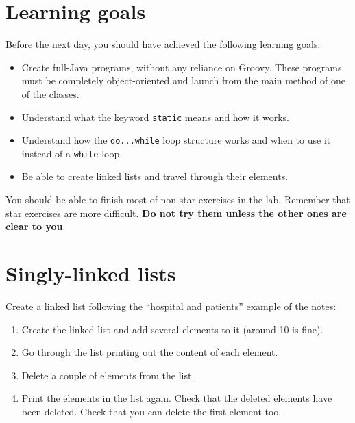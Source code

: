 \documentclass{article}
\begin{document}
\section*{Learning goals}
\label{sec:learning-goals}

Before the next day, you should have achieved the following learning
goals: 

\begin{itemize}
\item Create full-Java programs, without any reliance on Groovy. These
  programs must be completely object-oriented and launch from the main
  method of one of the classes.
\item Understand what the keyword \verb+static+ means and how it
  works. 
\item Understand how the \verb+do...while+ loop structure works and
  when to use it instead of a \verb+while+ loop.
\item Be able to create linked lists and travel through their
  elements. 
\end{itemize}

You should be able to finish most of non-star exercises in the lab. 
Remember that star exercises are more difficult. 
\textbf{Do not try them unless the other ones are clear to you}. 

\section{Singly-linked lists}
\label{sec:doubly-linked-lists}

Create a linked list following  the ``hospital and patients'' example
of the notes:

\begin{enumerate}
\item Create the linked list and add several elements to it
  (around 10 is fine). 
\item Go through the list printing out the content of
  each element.
\item Delete a couple of elements from the list. 
\item Print the elements in the list again. Check that the deleted
  elements have been deleted. Check that you can delete the first
  element too. 
\end{enumerate}

\end{document}
